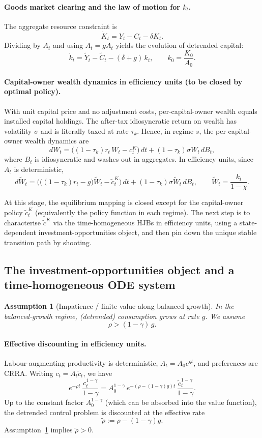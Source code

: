 \documentclass{article}
\newtheorem{assumption}{Assumption}
\begin{document}
\paragraph{Goods market clearing and the law of motion for $k_t$.}
The aggregate resource constraint is
$$
\dot K_t = Y_t - C_t - \delta K_t.
$$
Dividing by $A_t$ and using $\dot A_t = gA_t$ yields the evolution of detrended capital:
$$
\dot k_t = \tilde Y_t - \tilde C_t - (\delta+g)\,k_t,
\qquad k_0 = \frac{K_0}{A_0}.
$$

\paragraph{Capital-owner wealth dynamics in efficiency units (to be closed by optimal policy).}
With unit capital price and no adjustment costs, per-capital-owner wealth equals installed capital holdings. The after-tax idiosyncratic return on wealth has volatility $\sigma$ and is literally taxed at rate $\tau_k$. Hence, in regime $s$, the per-capital-owner wealth dynamics are
$$
dW_t = \Big((1-\tau_k)r_t\,W_t - c^K_t\Big)\,dt
+ (1-\tau_k)\sigma W_t\,dB_t,
$$
where $B_t$ is idiosyncratic and washes out in aggregates.
In efficiency units, since $A_t$ is deterministic,
$$
d\tilde W_t
= \Big(\big((1-\tau_k)r_t-g\big)\tilde W_t - \tilde c^K_t\Big)\,dt
+ (1-\tau_k)\sigma \tilde W_t\,dB_t,
\qquad \tilde W_t = \frac{k_t}{1-\chi}.
$$

At this stage, the equilibrium mapping is closed except for the capital-owner policy $\tilde c^K_t$ (equivalently the policy function in each regime). The next step is to characterise $\tilde c^K$ via the time-homogeneous HJBs in efficiency units, using a state-dependent investment-opportunities object, and then pin down the unique stable transition path by shooting.

\subsection{The investment-opportunities object and a time-homogeneous ODE system}
\label{sec:inv_opp_ode}

\begin{assumption}[Impatience / finite value along balanced growth]
\label{ass:impatience}
In the balanced-growth regime, (detrended) consumption grows at rate $g$. We assume
$$
\rho > (1-\gamma)\,g.
$$
\end{assumption}

\paragraph{Effective discounting in efficiency units.}
Labour-augmenting productivity is deterministic, $A_t = A_0 e^{gt}$, and preferences are CRRA. Writing $c_t = A_t \tilde c_t$, we have
$$
e^{-\rho t}\,\frac{c_t^{1-\gamma}}{1-\gamma}
= A_0^{1-\gamma}\,e^{-(\rho-(1-\gamma)g)t}\,\frac{\tilde c_t^{1-\gamma}}{1-\gamma}.
$$
Up to the constant factor $A_0^{1-\gamma}$ (which can be absorbed into the value function),
the detrended control problem is discounted at the effective rate
$$
\tilde\rho := \rho - (1-\gamma)g.
$$
Assumption~\ref{ass:impatience} implies $\tilde\rho>0$.
\end{document}
